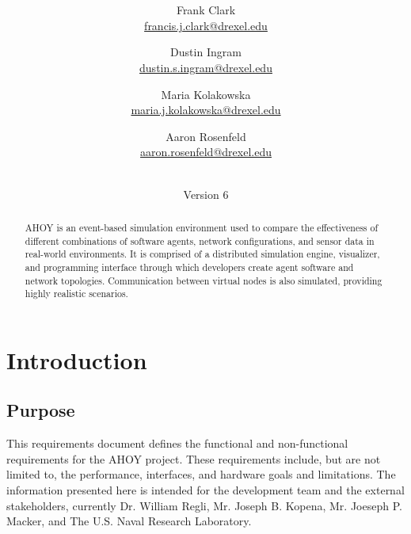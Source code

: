 \documentclass[titlepage]{article}
\title{\textbf{\mytitle}}
\author{
	Frank Clark \\\url{francis.j.clark@drexel.edu}
    \and Dustin Ingram \\\url{dustin.s.ingram@drexel.edu}
	\and Maria Kolakowska \\\url{maria.j.kolakowska@drexel.edu}
    \and Aaron Rosenfeld \\\url{aaron.rosenfeld@drexel.edu}
}
\date{\mydate\\Version 6}
\begin{document}

\begin{figure}
    \centering
    \scalebox{0.8}{}
    \vspace{-4em}
\end{figure}

\maketitle

\begin{abstract}
AHOY is an event-based simulation environment used to compare the effectiveness of different combinations of software agents, network configurations, and sensor data in real-world environments.  It is comprised of a distributed simulation engine, visualizer, and programming interface through which developers create agent software and network topologies.  Communication between virtual nodes is also simulated, providing highly realistic scenarios.
\end{abstract}

\setcounter{tocdepth}{4}
\tableofcontents
\pagebreak
\listoffigures
\pagebreak
{}



\section{Introduction%
  \label{introduction}%
}


\subsection{Purpose%
  \label{purpose}%
}

This requirements document defines the functional and non-functional requirements for the AHOY project.  These requirements include, but are not limited to, the performance, interfaces, and hardware goals and limitations.  The information presented here is intended for the development team and the external stakeholders, currently Dr. William Regli, Mr. Joseph B. Kopena, Mr. Joeseph P. Macker, and The U.S. Naval Research Laboratory.
\end{document}
